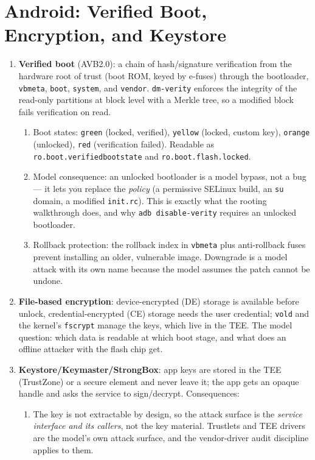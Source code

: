 \documentclass[12pt]{Training}
\begin{document}
\section*{Android: Verified Boot, Encryption, and Keystore}
\begin{enumerate}
    \item \textbf{Verified boot} (AVB2.0): a chain of hash/signature verification from the hardware root of trust (boot ROM, keyed by e-fuses) through the bootloader, \lstinline{vbmeta}, \lstinline{boot}, \lstinline{system}, and \lstinline{vendor}. \lstinline{dm-verity} enforces the integrity of the read-only partitions at block level with a Merkle tree, so a modified block fails verification on read.
    \begin{enumerate}
        \item Boot states: \lstinline{green} (locked, verified), \lstinline{yellow} (locked, custom key), \lstinline{orange} (unlocked), \lstinline{red} (verification failed). Readable as \lstinline{ro.boot.verifiedbootstate} and \lstinline{ro.boot.flash.locked}.
        \item Model consequence: an unlocked bootloader is a model bypass, not a bug --- it lets you replace the \emph{policy} (a permissive SELinux build, an \lstinline{su} domain, a modified \lstinline{init.rc}). This is exactly what the rooting walkthrough does, and why \lstinline{adb disable-verity} requires an unlocked bootloader.
        \item Rollback protection: the rollback index in \lstinline{vbmeta} plus anti-rollback fuses prevent installing an older, vulnerable image. Downgrade is a model attack with its own name because the model assumes the patch cannot be undone.
    \end{enumerate}
    \item \textbf{File-based encryption}: device-encrypted (DE) storage is available before unlock, credential-encrypted (CE) storage needs the user credential; \lstinline{vold} and the kernel's \lstinline{fscrypt} manage the keys, which live in the TEE. The model question: which data is readable at which boot stage, and what does an offline attacker with the flash chip get.
    \item \textbf{Keystore/Keymaster/StrongBox}: app keys are stored in the TEE (TrustZone) or a secure element and never leave it; the app gets an opaque handle and asks the service to sign/decrypt. Consequences:
    \begin{enumerate}
        \item The key is not extractable by design, so the attack surface is the \emph{service interface and its callers}, not the key material. Trustlets and TEE drivers are the model's own attack surface, and the vendor-driver audit discipline applies to them.

\end{enumerate}
\end{enumerate}
\end{document}
